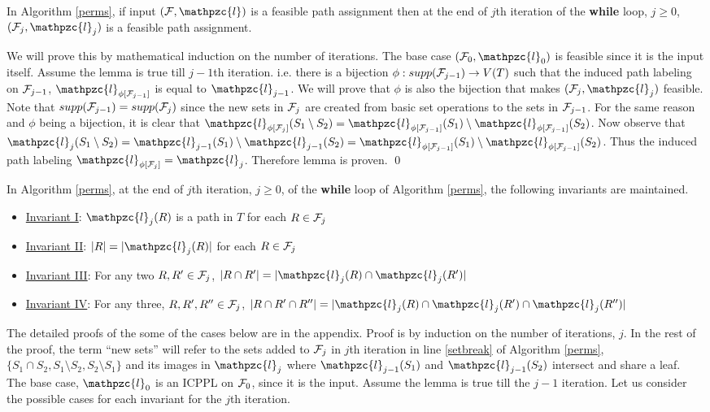 \documentclass{fsttcs}
\def\cF{{\cal F}}
\def\cl{\mathpzc{l}}
\begin{document}
\begin{lemma} 
  \label{lem:feasible} In Algorithm \ref{perms}, if input $(\cF, \cl)$ is a
  feasible path assignment then at the end of $j$th iteration of the
  {\bf while} loop, $j \ge 0$, 
  $(\cF_j, \cl_j)$ is a feasible path assignment.
\end{lemma}
\proof
  We will prove this by mathematical induction on the number of
  iterations. The base case $(\cF_0, \cl_0)$ is feasible since it is
  the input itself. Assume the lemma is true till $j-1$th
  iteration. i.e. there is a bijection $\phi: supp(\cF_{j-1})
  \rightarrow V(T)$ such that the induced path labeling on $\cF_{j-1}$,
   $\cl_{\phi[{\cF_{j-1}}]}$ is equal to $\cl_{j-1}$. We will prove that $\phi$ is
  also the bijection that makes $(\cF_j, \cl_j)$ feasible. Note that
  $supp(\cF_{j-1}) = supp(\cF_{j})$ since the new sets in $\cF_j$ are
  created from basic set operations to the sets in $\cF_{j-1}$. For
  the same reason and
  $\phi$ being a bijection, it is clear that $ \cl_{\phi[{\cF_{j}}]}(S_1
  \setminus S_2) = \cl_{\phi[{\cF_{j-1}}]}(S_1) \setminus
  \cl_{\phi[{\cF_{j-1}}]}(S_2)$. Now observe that $ \cl_j(S_1
  \setminus S_2) = \cl_{j-1}(S_1) \setminus \cl_{j-1}(S_2) =
  \cl_{\phi[{\cF_{j-1}}]}(S_1) \setminus
  \cl_{\phi[{\cF_{j-1}}]}(S_2)$. Thus the induced path labeling $\cl_{\phi[{\cF_{j}}]} =
  \cl_{j}$. Therefore lemma is proven. 
\qed


\begin{lemma} 
  \label{lem:invar1} In Algorithm \ref{perms}, at the end of $j$th
  iteration, $j \ge 0$, of the {\bf while} loop of Algorithm
  \ref{perms}, the following invariants are maintained.
\begin{itemize}
\item []\underline {Invariant I}: $\cl_j(R)$ is a path in $T$ for each $R \in \cF_j$
\item []\underline {Invariant II}: $|R| = |\cl_j(R)|$ for each $R \in \cF_j$
\item []\underline {Invariant III}: For any two $R, R' \in \cF_j$,
  $|R \cap R'| = |\cl_j(R) \cap \cl_j(R')|$
\item []\underline {Invariant IV}: For any three, $R, R', R'' \in \cF_j$,
  $|R \cap R' \cap R''|=|\cl_j(R) \cap \cl_j(R') \cap \cl_j(R'')|$
\end{itemize}
\end{lemma}
\proof
The detailed proofs of the some of the cases below are in the appendix.
  Proof is by induction on the number of iterations, $j$. In the rest
  of the proof, the term ``new sets'' will refer to the sets added
  to $\cF_j$ in $j$th iteration in line \ref{setbreak} of Algorithm
  \ref{perms}, $\{S_1 \cap S_2, S_1 \setminus S_2, S_2 \setminus S_1
  \}$ and its images in $\cl_j$ where $\cl_{j-1}(S_1)$ and
  $\cl_{j-1}(S_2)$
  intersect and share a leaf.\\
  \noindent
  The base case, $\cl_0$ is an ICPPL on $\cF_0$, since it is the
  input.  Assume the lemma is true till the $j-1$ iteration. Let us consider
the possible cases for each invariant for the  $j$th  iteration.
\end{document}
